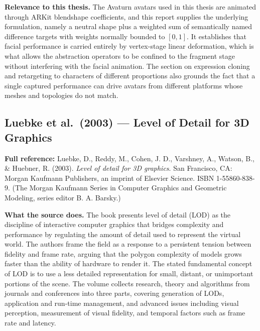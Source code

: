 \documentclass[11pt, a4paper]{article}
\begin{document}
\textbf{Relevance to this thesis.} The Avaturn avatars used in this thesis are animated through ARKit blendshape coefficients, and this report supplies the underlying formulation, namely a neutral shape plus a weighted sum of semantically named difference targets with weights normally bounded to $[0,1]$. It establishes that facial performance is carried entirely by vertex-stage linear deformation, which is what allows the abstraction operators to be confined to the fragment stage without interfering with the facial animation. The section on expression cloning and retargeting to characters of different proportions also grounds the fact that a single captured performance can drive avatars from different platforms whose meshes and topologies do not match.

\vspace{8pt}

\subsection{Luebke et al.\ (2003) --- Level of Detail for 3D Graphics}

\begin{refbox}
\textbf{Full reference:} Luebke, D., Reddy, M., Cohen, J. D., Varshney, A., Watson, B., \& Huebner, R. (2003). \emph{Level of detail for 3D graphics}. San Francisco, CA: Morgan Kaufmann Publishers, an imprint of Elsevier Science. ISBN 1-55860-838-9. (The Morgan Kaufmann Series in Computer Graphics and Geometric Modeling, series editor B. A. Barsky.)
\end{refbox}

\textbf{What the source does.} The book presents level of detail (LOD) as the discipline of interactive computer graphics that bridges complexity and performance by regulating the amount of detail used to represent the virtual world. The authors frame the field as a response to a persistent tension between fidelity and frame rate, arguing that the polygon complexity of models grows faster than the ability of hardware to render it. The stated fundamental concept of LOD is to use a less detailed representation for small, distant, or unimportant portions of the scene. The volume collects research, theory and algorithms from journals and conferences into three parts, covering generation of LODs, application and run-time management, and advanced issues including visual perception, measurement of visual fidelity, and temporal factors such as frame rate and latency.
\end{document}
